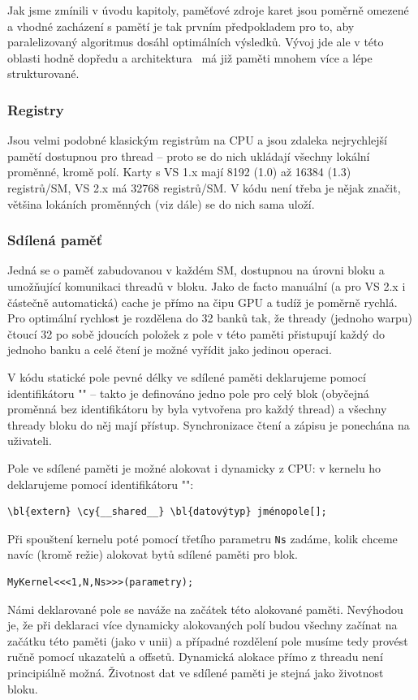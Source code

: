     Jak jsme zmínili v úvodu kapitoly, paměťové zdroje karet jsou poměrně omezené a vhodné zacházení s pamětí je tak prvním předpokladem pro to, aby paralelizovaný algoritmus dosáhl optimálních výsledků. Vývoj jde ale v této oblasti hodně dopředu a architektura \FERMI ~má již paměti mnohem více a lépe strukturované.

    \subsubsection{Registry}

    Jsou velmi podobné klasickým registrům na CPU a jsou zdaleka nejrychlejší pamětí dostupnou pro thread -- proto se do nich ukládají všechny lokální proměnné, kromě polí. Karty s VS 1.x mají 8192 (1.0) až 16384 (1.3) registrů/SM, VS 2.x má 32768 registrů/SM. V kódu není třeba je nějak značit, většina lokáních proměnných (viz dále) se do nich sama uloží.

    \subsubsection{Sdílená paměť}

    Jedná se o paměť zabudovanou v každém SM, dostupnou na úrovni bloku a umožňující komunikaci threadů v bloku. Jako de facto manuální (a pro VS 2.x i částečně automatická) cache je přímo na čipu GPU a tudíž je poměrně rychlá. Pro optimální rychlost je rozdělena do 32 banků tak, že thready (jednoho warpu) čtoucí 32 po sobě jdoucích položek z pole v této paměti přistupují každý do jednoho banku a celé čtení je možné vyřídit jako jedinou operaci.

    V kódu statické pole pevné délky ve sdílené paměti deklarujeme pomocí identifikátoru \Vr"" -- takto je definováno jedno pole pro celý blok (obyčejná proměnná bez identifikátoru by byla vytvořena pro každý thread) a všechny thready bloku do něj mají přístup. Synchronizace čtení a zápisu je ponechána na uživateli.

    Pole ve sdílené paměti je možné alokovat i dynamicky z CPU: v kernelu ho deklarujeme pomocí identifikátoru \Vr"":
    \begin{Verbatim}[commandchars = \\\{\}]
\bl{extern} \cy{__shared__} \bl{datovýtyp} jménopole[];
    \end{Verbatim}
    Při spouštení kernelu poté pomocí třetího parametru {\tt Ns} zadáme, kolik chceme navíc (kromě režie) alokovat bytů sdílené paměti pro blok.
    \begin{Verbatim}[commandchars = \\\{\}]
MyKernel<<<1,N,Ns>>>(parametry);
    \end{Verbatim}
    Námi deklarované pole se naváže na začátek této alokované paměti. Nevýhodou je, že při deklaraci více dynamicky alokovaných polí budou všechny začínat na začátku této paměti (jako v unii) a případné rozdělení pole musíme tedy provést ručně pomocí ukazatelů a offsetů. Dynamická alokace přímo z threadu není principiálně možná. Životnost dat ve sdílené paměti je stejná jako životnost bloku.

